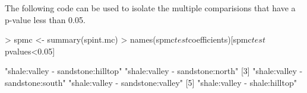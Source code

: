 \documentclass{article}
\begin{document}
The following code can be used to isolate the multiple comparisions that have a p-value less than 0.05.
\begin{Schunk}
\begin{Sinput}
> spmc <- summary(spint.mc)
> names(spmc$test$coefficients)[spmc$test$pvalues<0.05]
\end{Sinput}
\begin{Soutput}
[1] "shale:valley - sandstone:hilltop" "shale:valley - sandstone:north"  
[3] "shale:valley - sandstone:south"   "shale:valley - sandstone:valley" 
[5] "shale:valley - shale:hilltop"    
\end{Soutput}
\end{Schunk}
\end{document}
